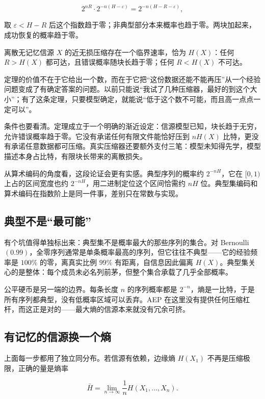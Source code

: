\[
2^{nR}\cdot 2^{-n(H-\varepsilon)}=2^{-n(H-R-\varepsilon)},
\]

取 \(\varepsilon<H-R\) 后这个指数趋于零；非典型部分本来概率也趋于零。两块加起来，成功恢复的概率趋于零。

\begin{theorem}
离散无记忆信源 \(X\) 的近无损压缩存在一个临界速率，恰为 \(H(X)\)：任何 \(R>H(X)\) 都可达，且错误概率随块长趋于零；任何 \(R<H(X)\) 不可达。
\end{theorem}

定理的价值不在于它给出一个数，而在于它把``这份数据还能不能再压''从一个经验问题变成了有确定答案的问题。以前只能说``我试了几种压缩器，最好的到这个大小''；有了这条定理，只要模型确定，就能说``低于这个数不可能，而且高一点点一定可以''。

条件也要看清。定理成立于一个明确的渐近设定：信源模型已知，块长趋于无穷，允许错误概率趋于零。它没有承诺任何有限文件能恰好压到 \(nH(X)\) 比特，更没有承诺任意数据都可压缩。真实压缩器还要额外支付三笔：模型未知得先学，模型描述本身占比特，有限块长带来的离散损失。

从算术编码的角度看，这段论证会更有实感。典型序列的概率约 \(2^{-nH}\)，它在 \([0,1)\) 上占的区间宽度也约 \(2^{-nH}\)，用二进制定位这个区间恰需约 \(nH\) 位。典型集编码和算术编码在指数阶上是同一件事，差别只在常数与实现。

\subsection{典型不是``最可能''}

有个坑值得单独标出来：典型集不是概率最大的那些序列的集合。对 Bernoulli\((0.99)\)，全零序列通常是单条概率最高的序列，但它往往不典型——它的经验频率是 \(100\%\) 的零，离真实比例 \(99\%\) 有距离，自信息因此偏离 \(H(X)\)。典型集关心的是整体：每个成员未必名列前茅，但整个集合承载了几乎全部概率。

公平硬币是另一端的边界。每条长度 \(n\) 的序列概率都是 \(2^{-n}\)，熵是一比特，于是所有序列都典型，没有低概率区域可以丢弃。AEP 在这里没有提供任何压缩杠杆，而这正是对的——最大熵的信源本来就没有冗余可挤。

\subsection{有记忆的信源换一个熵}

上面每一步都用了独立同分布。若信源有依赖，边缘熵 \(H(X_1)\) 不再是压缩极限，正确的量是熵率

\[
\bar H=\lim_{n\to\infty}\frac1n H(X_1,\dots,X_n).
\]


